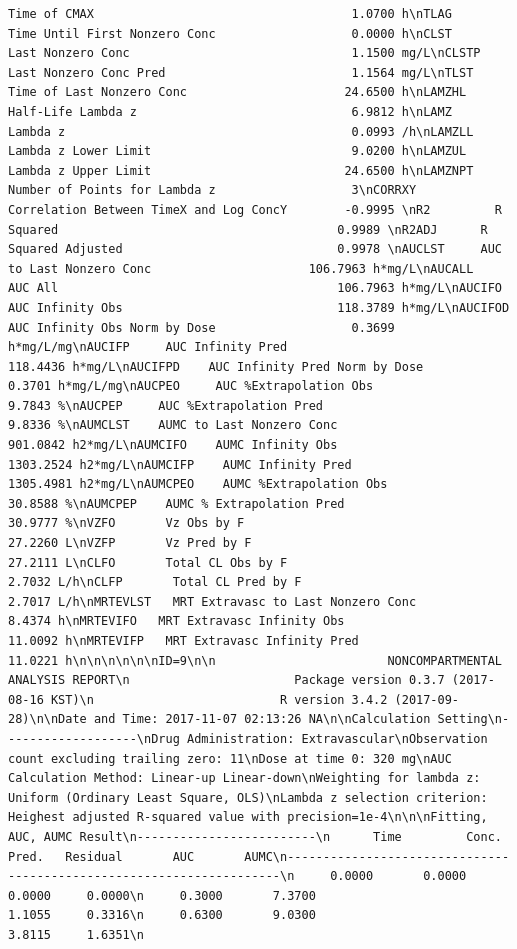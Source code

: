 \documentclass[12pt,]{krantz}
\theoremstyle{definition}
\theoremstyle{definition}
\theoremstyle{definition}
\theoremstyle{remark}
\begin{document}
\begin{verbatim}
Time of CMAX                                    1.0700 h\nTLAG       Time Until First Nonzero Conc                   0.0000 h\nCLST       Last Nonzero Conc                               1.1500 mg/L\nCLSTP      Last Nonzero Conc Pred                          1.1564 mg/L\nTLST       Time of Last Nonzero Conc                      24.6500 h\nLAMZHL     Half-Life Lambda z                              6.9812 h\nLAMZ       Lambda z                                        0.0993 /h\nLAMZLL     Lambda z Lower Limit                            9.0200 h\nLAMZUL     Lambda z Upper Limit                           24.6500 h\nLAMZNPT    Number of Points for Lambda z                   3\nCORRXY     Correlation Between TimeX and Log ConcY        -0.9995 \nR2         R Squared                                       0.9989 \nR2ADJ      R Squared Adjusted                              0.9978 \nAUCLST     AUC to Last Nonzero Conc                      106.7963 h*mg/L\nAUCALL     AUC All                                       106.7963 h*mg/L\nAUCIFO     AUC Infinity Obs                              118.3789 h*mg/L\nAUCIFOD    AUC Infinity Obs Norm by Dose                   0.3699 h*mg/L/mg\nAUCIFP     AUC Infinity Pred                             118.4436 h*mg/L\nAUCIFPD    AUC Infinity Pred Norm by Dose                  0.3701 h*mg/L/mg\nAUCPEO     AUC %Extrapolation Obs                          9.7843 %\nAUCPEP     AUC %Extrapolation Pred                         9.8336 %\nAUMCLST    AUMC to Last Nonzero Conc                     901.0842 h2*mg/L\nAUMCIFO    AUMC Infinity Obs                            1303.2524 h2*mg/L\nAUMCIFP    AUMC Infinity Pred                           1305.4981 h2*mg/L\nAUMCPEO    AUMC %Extrapolation Obs                        30.8588 %\nAUMCPEP    AUMC % Extrapolation Pred                      30.9777 %\nVZFO       Vz Obs by F                                    27.2260 L\nVZFP       Vz Pred by F                                   27.2111 L\nCLFO       Total CL Obs by F                               2.7032 L/h\nCLFP       Total CL Pred by F                              2.7017 L/h\nMRTEVLST   MRT Extravasc to Last Nonzero Conc              8.4374 h\nMRTEVIFO   MRT Extravasc Infinity Obs                     11.0092 h\nMRTEVIFP   MRT Extravasc Infinity Pred                    11.0221 h\n\n\n\n\n\nID=9\n\n                        NONCOMPARTMENTAL ANALYSIS REPORT\n                       Package version 0.3.7 (2017-08-16 KST)\n                          R version 3.4.2 (2017-09-28)\n\nDate and Time: 2017-11-07 02:13:26 NA\n\nCalculation Setting\n-------------------\nDrug Administration: Extravascular\nObservation count excluding trailing zero: 11\nDose at time 0: 320 mg\nAUC Calculation Method: Linear-up Linear-down\nWeighting for lambda z: Uniform (Ordinary Least Square, OLS)\nLambda z selection criterion: Heighest adjusted R-squared value with precision=1e-4\n\n\nFitting, AUC, AUMC Result\n-------------------------\n      Time         Conc.      Pred.   Residual       AUC       AUMC\n---------------------------------------------------------------------\n     0.0000       0.0000                           0.0000     0.0000\n     0.3000       7.3700                           1.1055     0.3316\n     0.6300       9.0300                           3.8115     1.6351\n     
\end{verbatim}
\end{document}
